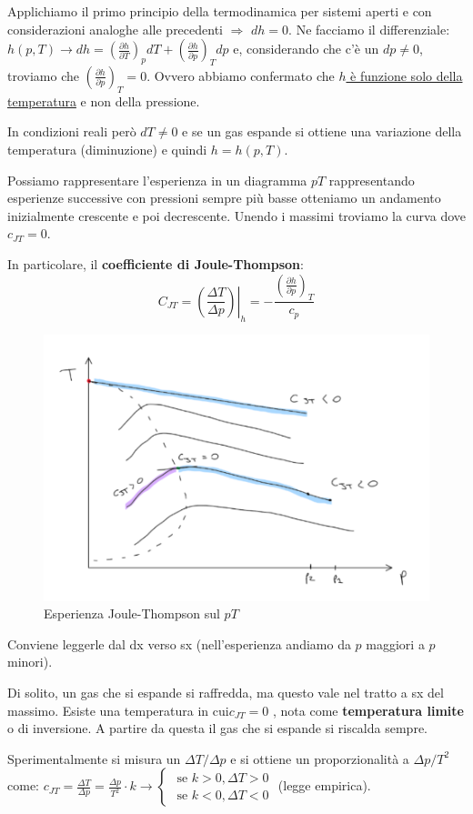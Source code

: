 \documentclass[a4paper]{article}
\numberwithin{equation}{section}%
\begin{document}
Applichiamo il primo principio della termodinamica per sistemi aperti e con considerazioni analoghe alle precedenti $\Longrightarrow$ $dh=0$.  Ne facciamo il differenziale: $h(p, T) \rightarrow d h=\left(\frac{\partial h}{\partial T}\right)_{p} d T+\left(\frac{\partial h}{\partial p}\right)_{T} d p$ e, considerando che c'è un $dp\neq 0$, troviamo che $\left(\frac{\partial h}{\partial p}\right)_{T}=0$. Ovvero abbiamo confermato che \underline{$h$ è funzione solo della temperatura} e non della pressione.
\newline

In condizioni reali però $dT\neq 0$ e se un gas espande si ottiene una variazione della temperatura (diminuzione) e quindi $h=h\left(p,T\right)$. 

Possiamo rappresentare l'esperienza in un diagramma $pT$ rappresentando esperienze successive con pressioni sempre più basse otteniamo un andamento inizialmente crescente e poi decrescente. Unendo i massimi troviamo la curva dove $c_{JT}=0$. 

In particolare, il \textbf{coefficiente di Joule-Thompson}:
\begin{equation}
C_{J T}=\left.\left(\frac{\Delta T}{\Delta p}\right)\right|_{h}=-\frac{\left(\frac{\partial h}{\partial p}\right)_{T}}{c_{p}}
\end{equation}


\begin{figure}[H]
	\begin{center}
		\includegraphics[width=0.4\columnwidth]{jt-pt.png}
		\caption{Esperienza Joule-Thompson sul $pT$}
	\end{center}
\end{figure}

Conviene leggerle dal dx verso sx (nell'esperienza andiamo da $p$ maggiori a $p$ minori). 

Di solito, un gas che si espande si raffredda, ma questo vale nel tratto a sx del massimo. Esiste una temperatura in cui$ c_{JT}=0$ , nota come \textbf{temperatura limite} o di inversione. A partire da questa il gas che si espande si riscalda sempre.

Sperimentalmente si misura un $\Delta T/\Delta p$ e si ottiene un proporzionalità a $\Delta p/T^2$ come:  $ c_{J T}=\frac{\Delta T}{\Delta p}=\frac{\Delta p}{T^{2}} \cdot k \rightarrow\left\{\begin{array}{l}
	\text { se } k>0, \Delta T>0 \\
	\text { se } k<0, \Delta T<0
\end{array}\right.$ (legge empirica).
\end{document}
